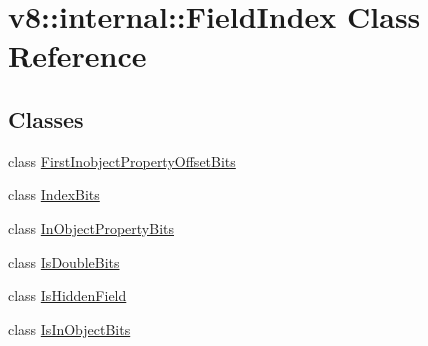 \hypertarget{classv8_1_1internal_1_1_field_index}{}\section{v8\+:\+:internal\+:\+:Field\+Index Class Reference}
\label{classv8_1_1internal_1_1_field_index}
\subsection*{Classes}
\begin{DoxyCompactItemize}
\item 
class \hyperlink{classv8_1_1internal_1_1_field_index_1_1_first_inobject_property_offset_bits}{First\+Inobject\+Property\+Offset\+Bits}
\item 
class \hyperlink{classv8_1_1internal_1_1_field_index_1_1_index_bits}{Index\+Bits}
\item 
class \hyperlink{classv8_1_1internal_1_1_field_index_1_1_in_object_property_bits}{In\+Object\+Property\+Bits}
\item 
class \hyperlink{classv8_1_1internal_1_1_field_index_1_1_is_double_bits}{Is\+Double\+Bits}
\item 
class \hyperlink{classv8_1_1internal_1_1_field_index_1_1_is_hidden_field}{Is\+Hidden\+Field}
\item 
class \hyperlink{classv8_1_1internal_1_1_field_index_1_1_is_in_object_bits}{Is\+In\+Object\+Bits}
\end{DoxyCompactItemize}
